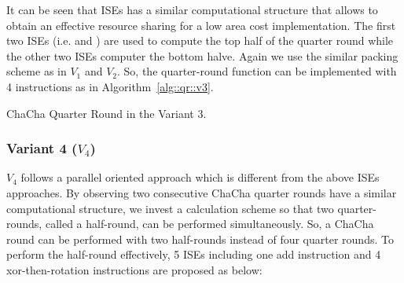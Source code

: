 It can be seen that ISEs has a similar computational structure that allows to obtain an effective resource sharing for a low area cost implementation.
The first two ISEs (i.e.  and ) are used to compute the top half of the quarter round while the other two ISEs computer the bottom halve.
Again we use the similar packing scheme as in $V_1$ and $V_2$. So, the quarter-round function can be implemented with 4 instructions as in Algorithm~\ref{alg::qr::v3}.

\begin{algorithm}
\BlankLine
{}
\caption{ChaCha Quarter Round in the Variant 3.}
\label{alg::qr::v3}
\end{algorithm}


\subsubsection{Variant 4 ($V_4$)}
$V_4$ follows a parallel oriented approach which is different from the above ISEs approaches. By observing two consecutive ChaCha quarter rounds have a similar computational structure, we invest a calculation scheme so that two quarter-rounds, called a half-round, can be performed simultaneously. So, a ChaCha round can be performed with two half-rounds instead of four quarter rounds. To perform the half-round effectively, 5 ISEs including one add instruction and 4 xor-then-rotation instructions are proposed as below:   

